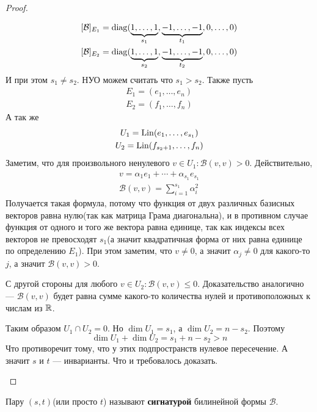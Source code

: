 \documentclass[../main.tex]{subfiles}
\begin{document}
\begin{proof}
\begin{enumerate}
\begin{equation*}
      \begin{gathered}
        [\mathcal{B}]_{E_1} = \diag(
        \underbrace{1, \dotsc, 1}_{s_1},
        \underbrace{-1, \dotsc, -1}_{t_1},
        0, \dotsc, 0) \\
        [\mathcal{B}]_{E_2} = \diag(
          \underbrace{1, \dotsc, 1}_{s_2},
          \underbrace{-1, \dotsc, -1}_{t_2},
          0, \dotsc, 0)
      \end{gathered}
    \end{equation*}
    И при этом $s_1 \neq s_2$. НУО можем считать что $s_1 > s_2$. Также пусть
    \begin{equation*}
      \begin{gathered}
        E_1 = (e_1, \dotsc, e_n) \\
        E_2 = (f_1, \dotsc, f_n)
      \end{gathered}
    \end{equation*}
    А так же
    \begin{equation*}
      \begin{gathered}
        U_1 = \operatorname{Lin}(e_1, \dotsc, e_{s_1}) \\
        U_2 = \operatorname{Lin}(f_{s_2 + 1}, \dotsc, f_n)
      \end{gathered}
    \end{equation*}
    Заметим, что для произвольного ненулевого $v \in U_1\colon \mathcal{B}(v, v) > 0$. Действительно,
    \begin{equation*}
      \begin{gathered}
        v = \alpha_1 e_1 + \dotsb + \alpha_{s_1} e_{s_1} \\
        \mathcal{B}(v, v) = \sum\limits_{i = 1}^{s_1} \alpha_i^2
      \end{gathered}
    \end{equation*}
    Получается такая формула, потому что функция от двух различных базисных векторов равна нулю(так как матрица Грама диагональна), и в противном случае функция от одного и того же вектора равна единице, так как индексы всех векторов не превосходят $s_1$(а значит квадратичная форма от них равна единице по определению $E_1$). При этом заметим, что $v \neq 0$, а значит $\alpha_j \neq 0$ для какого-то $j$, а значит $\mathcal{B}(v, v) > 0$.

    С другой стороны для любого $v \in U_2\colon \mathcal{B}(v, v) \leq 0$. Доказательство аналогично --- $\mathcal{B}(v, v)$ будет равна сумме какого-то количества нулей и противоположных к числам из $\mathbb{R}$.

    Таким образом $U_1 \cap U_2 = 0$. Но $\dim U_1 = s_1$, а $\dim U_2 = n - s_2$. Поэтому
    \begin{equation*}
      \dim U_1 + \dim U_2 = s_1 + n - s_2 > n
    \end{equation*}
    Что противоречит тому, что у этих подпространств нулевое пересечение. А значит $s$ и $t$ --- инварианты. Что и требовалось доказать.
  \end{enumerate}
\end{proof}

\begin{definition}
  Пару $(s, t)$(или просто $t$) называют \textbf{сигнатурой} билинейной формы $\mathcal{B}$.
\end{definition}
\end{document}
